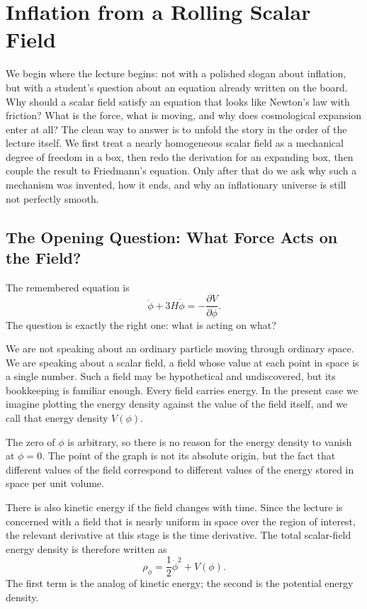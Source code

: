 \chapter{Inflation from a Rolling Scalar Field}

We begin where the lecture begins: not with a polished slogan about inflation, but with a student's question about an equation already written on the board. Why should a scalar field satisfy an equation that looks like Newton's law with friction? What is the force, what is moving, and why does cosmological expansion enter at all? The clean way to answer is to unfold the story in the order of the lecture itself. We first treat a nearly homogeneous scalar field as a mechanical degree of freedom in a box, then redo the derivation for an expanding box, then couple the result to Friedmann's equation. Only after that do we ask why such a mechanism was invented, how it ends, and why an inflationary universe is still not perfectly smooth.

\section{The Opening Question: What Force Acts on the Field?}

The remembered equation is
\begin{equation}
\ddot{\phi}+3H\dot{\phi}=-\frac{\partial V}{\partial \phi}.
\end{equation}
The question is exactly the right one: what is acting on what?

We are not speaking about an ordinary particle moving through ordinary space. We are speaking about a scalar field, a field whose value at each point in space is a single number. Such a field may be hypothetical and undiscovered, but its bookkeeping is familiar enough. Every field carries energy. In the present case we imagine plotting the energy density against the value of the field itself, and we call that energy density \(V(\phi)\).

The zero of \(\phi\) is arbitrary, so there is no reason for the energy density to vanish at \(\phi=0\). The point of the graph is not its absolute origin, but the fact that different values of the field correspond to different values of the energy stored in space per unit volume.

There is also kinetic energy if the field changes with time. Since the lecture is concerned with a field that is nearly uniform in space over the region of interest, the relevant derivative at this stage is the time derivative. The total scalar-field energy density is therefore written as
\begin{equation}
\rho_{\phi}=\frac{1}{2}\dot{\phi}^{2}+V(\phi).
\end{equation}
The first term is the analog of kinetic energy; the second is the potential energy density.


